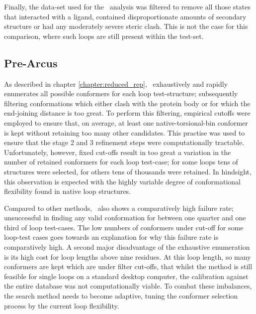 Finally, the data-set used for the \plop\ analysis was filtered to remove all those states that interacted with a ligand, contained disproportionate amounts of secondary structure or had any moderately severe steric clash.
This is not the case for this comparison, where such loops are still present within the test-set.







\subsection{Pre-Arcus}
\label{section:methcomp:prearcus:final_remarks}



As described in chapter \ref{chapter:reduced_rep}, \prearcus\ exhaustively and rapidly enumerates all possible conformers for each loop test-structure; subsequently filtering conformations which either clash with the protein body or for which the end-joining distance is too great. To perform this filtering, empirical cutoffs were employed to ensure that, on average, at least one native-torsional-bin conformer is kept without retaining too many other candidates. This practise was used to ensure that the stage 2 and 3 refinement steps were computationally tractable. Unfortunately, however, fixed cut-offs result in too great a variation in the number of retained conformers for each loop test-case; for some loops tens of structures were selected, for others tens of thousands were retained. In hindsight, this observation is expected with the highly variable degree of conformational flexibility found in native loop structures. 

Compared to other methods, \prearcus\ also shows a comparatively high failure rate; unsuccessful in finding any valid conformation for  between one quarter and one third of loop test-cases. The low numbers of conformers under cut-off for some loop-test cases  goes towards an explanation for why this failure rate is comparatively high. A second major disadvantage of the exhaustive enumeration is its high cost for loop lengths above nine residues. At this loop length, so many conformers are kept which are under filter cut-offs, that whilst the method is still feasible for single loops on a standard desktop computer, the calibration against the entire database was not computationally viable. To combat these imbalances, the search method needs to become adaptive, tuning the conformer selection process by the current loop flexibility. 

